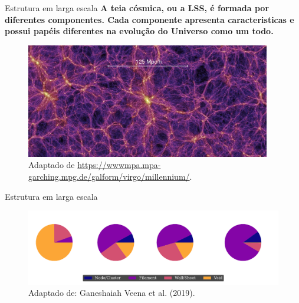 \begin{frame}[c]{Estrutura em larga escala}
    \textbf{A teia cósmica, ou a LSS, é formada por diferentes componentes. Cada componente apresenta caracteristicas e possui papéis diferentes na evolução do Universo como um todo.}
    \vspace*{-0.5cm}
    \begin{figure}
        \centering
        \includegraphics[height=5cm]{script/images/millenium.png}
        \caption{Adaptado de \url{https://wwwmpa.mpa-garching.mpg.de/galform/virgo/millennium/}.}
    \end{figure}

                
                
                
\end{frame}

\begin{frame}[c]{Estrutura em larga escala}
    \begin{figure}
        \centering
        \includegraphics[width=\linewidth]{script/images/lss_distribution.pdf}
        \caption{Adaptado de: Ganeshaiah Veena et al. (2019).}
    \end{figure}
\end{frame}

